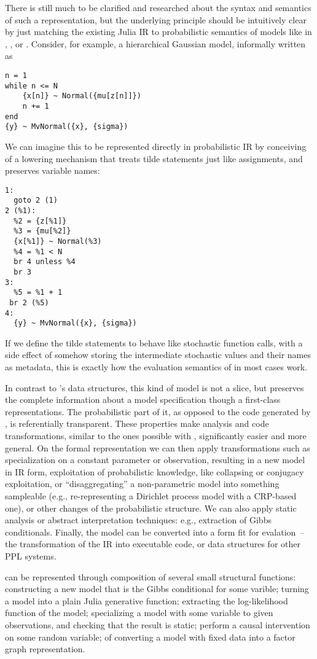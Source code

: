 There is still much to be clarified and researched about the syntax and semantics of such a
representation, but the underlying principle should be intuitively clear by just matching the
existing Julia IR to probabilistic semantics of models like in \turingjl{}, ,
or .  Consider, for example, a hierarchical Gaussian model, informally written
as
\begin{lstlisting}
n = 1
while n <= N
    {x[n]} ~ Normal({mu[z[n]]})
    n += 1
end
{y} ~ MvNormal({x}, {sigma})
\end{lstlisting}
We can imagine this to be represented directly in probabilistic IR by conceiving of a lowering
mechanism that treats tilde statements just like assignments, and preserves variable names:
\begin{lstlisting}
1:
  goto 2 (1)
2 (%1):
  %2 = {z[%1]}
  %3 = {mu[%2]}
  {x[%1]} ~ Normal(%3)
  %4 = %1 < N
  br 4 unless %4
  br 3
3:
  %5 = %1 + 1
 br 2 (%5)
4:
  {y} ~ MvNormal({x}, {sigma})
\end{lstlisting}
If we define the tilde statements to behave like stochastic function calls, with a side effect of
somehow storing the intermediate stochastic values and their names as metadata, this is exactly how
the evaluation semantics of \dppljl{} in most cases work.

In contrast to \autogibbsjl{}'s data structures, this kind of model is not a slice, but preserves
the complete information about a model specification though a first-class representations.  The
probabilistic part of it, as opposed to the code generated by \dppljl{}, is referentially
transparent.  These properties make analysis and code transformations, similar to the ones possible
with , significantly easier and more general.  On the formal representation
we can then apply transformations such as specialization on a constant parameter or observation,
resulting in a new model in IR form, exploitation of probabilistic knowledge, like collapsing or
conjugacy exploitation, or \enquote{disaggregating} a non-parametric model into something sampleable
(e.g., re-representing a Dirichlet process model with a CRP-based one), or other changes of the
probabilistic structure.  We can also apply static analysis or abstract interpretation techniques:
e.g., extraction of Gibbs conditionals.  Finally, the model can be converted into a form fit for
evalation~-- the transformation of the IR into executable code, or data structures for other PPL
systems.

 can be represented through composition of several small structural
functions: constructing a new model that is the Gibbs conditional for some varible; turning a model
into a plain Julia generative function; extracting the log-likelihood function of the model;
specializing a model with some variable to given observations, and checking that the result is
static; perform a causal intervention on some random variable; of converting a model with fixed data
into a factor graph representation.

